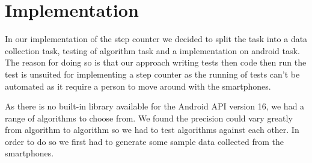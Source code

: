 \section{Implementation}
In our implementation of the step counter we decided to split the task into a data collection task, testing of algorithm task and a implementation on android task. The reason for doing so is that our approach writing tests then code then run the test is unsuited for implementing a step counter as the running of tests can't be automated as it require a person to move around with the smartphones.

As there is no built-in library available for the Android API version 16, we had a range of algorithms to choose from. We found the precision could vary greatly from algorithm to algorithm so we had to test algorithms against each other. In order to do so we first had to generate some sample data collected from the smartphones.

